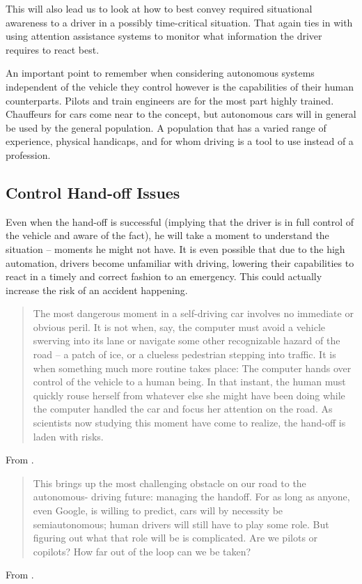 \documentclass{acm_proc_article-sp}
\begin{document}
This will also lead us to look at how to best convey required situational awareness to a driver in a possibly time-critical situation.
That again ties in with using attention assistance systems to monitor what information the driver requires to react best.

An important point to remember when considering autonomous systems independent of the vehicle they control however is the capabilities of their human counterparts.
Pilots and train engineers are for the most part highly trained.
Chauffeurs for cars come near to the concept, but autonomous cars will in general be used by the general population.
A population that has a varied range of experience, physical handicaps, and for whom driving is a tool to use instead of a profession.

\subsection{Control Hand-off Issues}
\label{hand_off_issue}

Even when the hand-off is successful (implying that the driver is in full control of the vehicle and aware of the fact), he will take a moment to understand the situation – moments he might not have.
It is even possible that due to the high automation, drivers become unfamiliar with driving, lowering their capabilities to react in a timely and correct fashion to an emergency.
This could actually increase the risk of an accident happening.

\begin{quote}
The most dangerous moment in a self-driving car involves no immediate or obvious peril.
It is not when, say, the computer must avoid a vehicle swerving into its lane or navigate some other recognizable hazard of the road -- a patch of ice, or a clueless pedestrian stepping into traffic.
It is when something much more routine takes place: The computer hands over control of the vehicle to a human being.
In that instant, the human must quickly rouse herself from whatever else she might have been doing while the computer handled the car and focus her attention on the road.
As scientists now studying this moment have come to realize, the hand-off is laden with risks.
\end{quote}
From \cite{www:huffington_post}.

\begin{quote}
This brings up the most challenging obstacle on our road to the autonomous- driving future: managing the handoff.
For as long as anyone, even Google, is willing to predict, cars will by necessity be semiautonomous; human drivers will still have to play some role.
But figuring out what that role will be is complicated.
Are we pilots or copilots? How far out of the loop can we be taken?
\end{quote}
From \cite{www:wired}.
\end{document}
